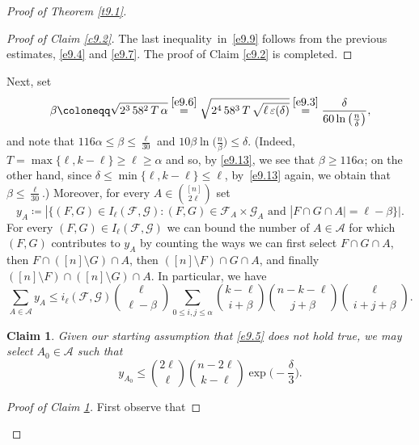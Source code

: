 \documentclass[10pt,a4paper]{amsart}
\newtheorem{claim}[thm]{Claim}
\theoremstyle{remark}
\newcommand{\ee}{\varepsilon}
\newcommand{\meg}{\geqslant}
\newcommand{\mik}{\leqslant}
\newcommand{\Fcal}{\mathcal{F}}
\newcommand{\Gcal}{\mathcal{G}}
\newcommand{\Acal}{\mathcal{A}}
\begin{document}
\begin{proof}[Proof of Theorem \emph{\ref{t9.1}}]
\begin{proof}[Proof of Claim \emph{\ref{c9.2}}]
The last inequality~in~\eqref{e9.9} follows from the previous estimates, \eqref{e9.4} and \eqref{e9.7}.
The proof of Claim \ref{c9.2} is completed.
\end{proof}
Next, set
\begin{equation} \label{e9.13}
\beta\coloneqq \sqrt{2^3\, 58^2\, T\,\alpha} \stackrel{\eqref{e9.6}}{=}
\sqrt{2^4\,58^3\, T\, \sqrt{\ell\, \ee(\delta)}} \stackrel{\eqref{e9.3}}{=}
\frac{\delta}{60\ln\big(\frac{n}{\delta}\big)},
\end{equation}
and note that $116\alpha \mik\beta\mik\frac{\ell}{30}$ and $10\beta\ln\big(\frac{n}{\beta}\big)\mik\delta$.
(Indeed, $T=\max\{\ell,k-\ell\}\meg \ell\meg\alpha$ and so, by \eqref{e9.13}, we see that
$\beta\meg 116\alpha$; on the other hand, since $\delta\mik \min\{\ell,k-\ell\}\mik \ell$,
by~\eqref{e9.13} again, we obtain that $\beta\mik \frac{\ell}{30}$.) Moreover, for every $A\in\binom{[n]}{2\ell}$ set
\begin{equation} \label{e9.14}
y_{A}\coloneqq |\{(F,G)\in I_{\ell}(\Fcal,\Gcal):(F,G)\in\Fcal_{A}\times\Gcal_{A}
\text{ and } |F\cap G \cap A|=\ell-\beta\}|.
\end{equation}
For every $(F,G)\in I_{\ell}(\Fcal,\Gcal)$ we can bound the number of $A\in\Acal$ for which $(F,G)$ contributes to $y_A$ by counting the ways we can first select $F\cap G \cap A$, then $F\cap([n]\setminus G)\cap A$, then $([n]\setminus F)\cap G\cap A$, and finally $([n]\setminus F)\cap ([n]\setminus G)\cap A$. In particular, we have
\begin{equation} \label{e9.15}
\sum_{A\in\Acal} y_{A} \mik i_{\ell}(\Fcal,\Gcal) \binom{\ell}{\ell-\beta}
\sum_{0\mik i, j\mik \alpha} \binom{k-\ell}{i+\beta} \binom{n-k-\ell}{j+\beta} \binom{\ell}{i+j+\beta}.
\end{equation}
\begin{claim} \label{cl-8-new}
Given our starting assumption that \eqref{e9.5} does not hold true, we may select $A_0\in\Acal$ such that
\begin{equation} \label{e9.16}
y_{A_0} \mik
\binom{2\ell}{\ell}\binom{n-2\ell}{k-\ell} \exp\Big(-\frac{\delta}{3}\Big).
\end{equation}
\end{claim}
\begin{proof}[Proof of Claim \emph{\ref{cl-8-new}}]
First observe that
\end{proof}
\end{proof}
\end{document}
